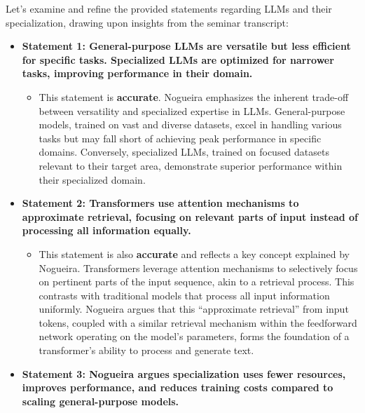 \documentclass[
]{article}
\author{}
\date{}
\begin{document}
Let's examine and refine the provided statements regarding LLMs and
their specialization, drawing upon insights from the seminar transcript:

\begin{itemize}
\item
  \textbf{Statement 1: General-purpose LLMs are versatile but less
  efficient for specific tasks. Specialized LLMs are optimized for
  narrower tasks, improving performance in their domain.}

  \begin{itemize}
  
  \item
    This statement is \textbf{accurate}. Nogueira emphasizes the
    inherent trade-off between versatility and specialized expertise in
    LLMs. General-purpose models, trained on vast and diverse datasets,
    excel in handling various tasks but may fall short of achieving peak
    performance in specific domains. Conversely, specialized LLMs,
    trained on focused datasets relevant to their target area,
    demonstrate superior performance within their specialized domain.
  \end{itemize}
\item
  \textbf{Statement 2: Transformers use attention mechanisms to
  approximate retrieval, focusing on relevant parts of input instead of
  processing all information equally.}

  \begin{itemize}
  
  \item
    This statement is also \textbf{accurate} and reflects a key concept
    explained by Nogueira. Transformers leverage attention mechanisms to
    selectively focus on pertinent parts of the input sequence, akin to
    a retrieval process. This contrasts with traditional models that
    process all input information uniformly. Nogueira argues that this
    ``approximate retrieval'' from input tokens, coupled with a similar
    retrieval mechanism within the feedforward network operating on the
    model's parameters, forms the foundation of a transformer's ability
    to process and generate text.
  \end{itemize}
\item
  \textbf{Statement 3: Nogueira argues specialization uses fewer
  resources, improves performance, and reduces training costs compared
  to scaling general-purpose models.}

  \begin{itemize}
  

\end{itemize}
\end{itemize}
\end{document}
